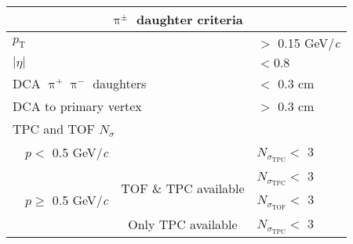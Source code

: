 \documentclass[ALICE,manyauthors]{cernphprep}
\newcommand{\Ks}{$\mathrm{K^{0}_{S}}$\xspace}
\providecommand{\DIFaddtex}[1]{{\protect\color{blue}\uwave{#1}}} %
\providecommand{\DIFdeltex}[1]{{\protect\color{red}\sout{#1}}}                      %
\providecommand{\DIFaddFL}[1]{\DIFadd{#1}} %
\providecommand{\DIFdelFL}[1]{\DIFdel{#1}} %
\providecommand{\DIFaddbeginFL}{} %
\providecommand{\DIFaddendFL}{} %
\providecommand{\DIFdelbeginFL}{} %
\providecommand{\DIFdelendFL}{} %
\providecommand{\DIFadd}[1]{\texorpdfstring{\DIFaddtex{#1}}{#1}} %
\providecommand{\DIFdel}[1]{\texorpdfstring{\DIFdeltex{#1}}{}} %
\begin{document}
\begin{table}[htbp]
\begin{tabular}{lc|c|l}
   
   \DIFdelbeginFL %
\DIFdelendFL \DIFaddbeginFL \multicolumn{4}{c}{$\uppi^{\pm}$ daughter criteria} \DIFaddendFL \\
   \hline
   \multicolumn{3}{l|}{$p_{\mathrm{T}}$} & $>$ 0.15 GeV/\textit{c} \\
   \hline
   \multicolumn{3}{l|}{$|\eta|$} &  $< 0.8$ \\
   \hline
   \DIFdelbeginFL %
\DIFdelendFL \DIFaddbeginFL \multicolumn{3}{l|}{DCA $\uppi^{+}\uppi^{-}$ daughters} \DIFaddendFL & $<$ 0.3 cm \\
   \hline
   \multicolumn{3}{l|}{DCA to primary vertex} & $>$ 0.3 cm \\
   \hline
   \multicolumn{4}{l}{TPC and TOF $N_{\sigma}$} \\
   \cline{2-4}
    & \multicolumn{1}{c}{$p <$ 0.5 GeV/\textit{c}} &  & \DIFdelbeginFL \DIFdelFL{$N_{\sigma_{\mathrm{TPC}}} <$ }\DIFdelendFL \DIFaddbeginFL \DIFaddFL{$N_{\sigma, \mathrm{TPC}} <$ }\DIFaddendFL 3 \\
   \cline{2-4}
    & \multicolumn{1}{c}{\multirow{3}{*}{$p \geq$ 0.5 GeV/\textit{c}}} &  \multirow{2}{*}{TOF \& TPC available} & \DIFdelbeginFL \DIFdelFL{$N_{\sigma_{\mathrm{TPC}}} <$ }\DIFdelendFL \DIFaddbeginFL \DIFaddFL{$N_{\sigma, \mathrm{TPC}} <$ }\DIFaddendFL 3 \\
    & \multicolumn{2}{c|}{} & \DIFdelbeginFL \DIFdelFL{$N_{\sigma_{\mathrm{TOF}}} <$ }\DIFdelendFL \DIFaddbeginFL \DIFaddFL{$N_{\sigma, \mathrm{TOF}} <$ }\DIFaddendFL 3 \\
   \cline{3-4}
    & \multicolumn{1}{c}{} & Only TPC available & \DIFdelbeginFL \DIFdelFL{$N_{\sigma_{\mathrm{TPC}}} <$ }\DIFdelendFL \DIFaddbeginFL \DIFaddFL{$N_{\sigma, \mathrm{TPC}} <$ }\DIFaddendFL 3 \\
   \hline   
  \end{tabular}
 \label{tab:K0sCuts} 
\end{table}
\end{document}

